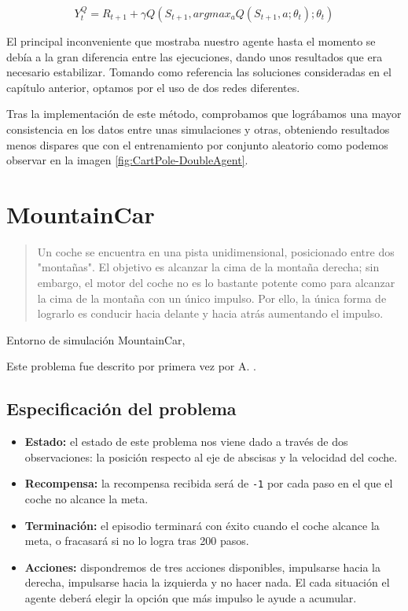 $$Y^Q_{t} = R_{t+1} + \gamma Q(S_{t+1}, argmax_{a} Q(S_{t+1}, a; \theta_{t}); \theta_{t})$$

El principal inconveniente que mostraba nuestro agente hasta el momento se debía a la gran diferencia entre las ejecuciones, dando unos resultados que era necesario estabilizar. Tomando como referencia las soluciones consideradas en el capítulo anterior, optamos por el uso de dos redes diferentes. 

Tras la implementación de este método, comprobamos que lográbamos una mayor consistencia en los datos entre unas simulaciones y otras, obteniendo resultados menos dispares que con el entrenamiento por conjunto aleatorio como podemos observar en la imagen \ref{fig:CartPole-DoubleAgent}.


\section{MountainCar}

\begin{quote}
    Un coche se encuentra en una pista unidimensional, posicionado entre dos "montañas". El objetivo es alcanzar la cima de la montaña derecha; sin embargo, el motor del coche no es lo bastante potente como para alcanzar la cima de la montaña con un único impulso. Por ello, la única forma de lograrlo es conducir hacia delante y hacia atrás aumentando el impulso.
\end{quote}

%
       {Entorno de simulación MountainCar, \citet{brockman2016openai}}

Este problema fue descrito por primera vez por A. \citet{Moore90efficientmemory-based}.

\subsection{Especificación del problema}

\begin{itemize}
    \item \textbf{Estado:} el estado de este problema nos viene dado a través de dos observaciones: la posición respecto al eje de abscisas y la velocidad del coche.
    \item \textbf{Recompensa:} la recompensa recibida será de \texttt{-1} por cada paso en el que el coche no alcance la meta.
    \item \textbf{Terminación:} el episodio terminará con éxito cuando el coche alcance la meta, o fracasará si no lo logra tras 200 pasos.
    \item \textbf{Acciones:} dispondremos de tres acciones disponibles, impulsarse hacia la derecha, impulsarse hacia la izquierda y no hacer nada. El cada situación el agente deberá elegir la opción que más impulso le ayude a acumular.
\end{itemize}

